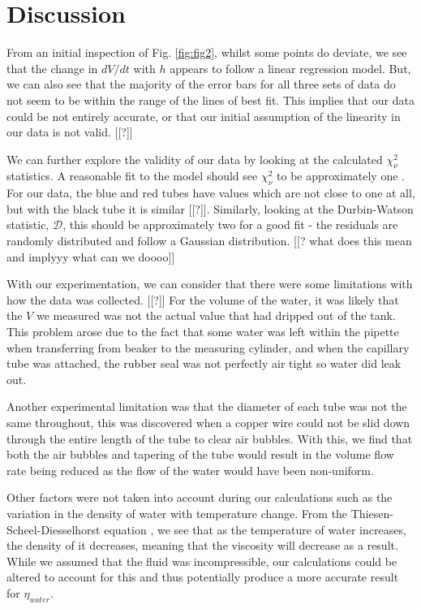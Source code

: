 \documentclass[twocolumn]{revtex4}
\begin{document}
\vspace{-3ex}
\section{Discussion}
\vspace{-2ex}
From an initial inspection of Fig. \ref{fig:fig2}, whilst some points do deviate, we see that the change in $dV/dt$ with $h$ appears to follow a linear regression model. But, we can also see that the majority of the error bars for all three sets of data do not seem to be within the range of the lines of best fit. This implies that our data could be not entirely accurate, or that our initial assumption of the linearity in our data is not valid. [[?]]

We can further explore the validity of our data by looking at the calculated $\chi^2_{\nu}$ statistics. A reasonable fit to the model should see $\chi^2_{\nu}$ to be approximately one \cite{hughesandhayes}. For our data, the blue and red tubes have values which are not close to one at all, but with the black tube it is similar [[?]]. Similarly, looking at the Durbin-Watson statistic, $\mathcal{D}$, this should be approximately two for a good fit \cite{hughesandhayes} - the residuals are randomly distributed and follow a Gaussian distribution.  [[? what does this mean and implyyy what can we doooo]] 

With our experimentation, we can consider that there were some limitations with how the data was collected. [[?]] For the volume of the water, it was likely that the $V$ we measured was not the actual value that had dripped out of the tank. This problem arose due to the fact that some water was left within the pipette when transferring from beaker to the measuring cylinder, and when the capillary tube was attached, the rubber seal was not perfectly air tight so water did leak out.

Another experimental limitation was that the diameter of each tube was not the same throughout, this was discovered when a copper wire could not be slid down through the entire length of the tube to clear air bubbles. With this, we find that both the air bubbles and tapering of the tube would result in the volume flow rate being reduced as the flow of the water would have been non-uniform.

Other factors were not taken into account during our calculations such as the variation in the density of water with temperature change. From the Thiesen-Scheel-Diesselhorst equation \cite{dentemp}, we see that as the temperature of water increases, the density of it decreases, meaning that the viscosity will decrease as a result. While we assumed that the fluid was incompressible, our calculations could be altered to account for this and thus potentially produce a more accurate result for $\eta_{water}$.
\end{document}

